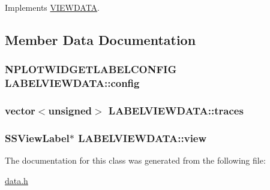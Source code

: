 Implements \hyperlink{class_v_i_e_w_d_a_t_a_1b4cca271e32b8d47b615e75dbf0624e}{VIEWDATA}.

\subsection{Member Data Documentation}
\hypertarget{class_l_a_b_e_l_v_i_e_w_d_a_t_a_932c69aa990d980c0240d2f200e5fda6}{
\subsubsection[{config}]{\setlength{\rightskip}{0pt plus 5cm}NPLOTWIDGETLABELCONFIG {\bf LABELVIEWDATA::config}}}
\label{class_l_a_b_e_l_v_i_e_w_d_a_t_a_932c69aa990d980c0240d2f200e5fda6}


\hypertarget{class_l_a_b_e_l_v_i_e_w_d_a_t_a_7bd9372bf57d18700d287c7fc3531295}{
\subsubsection[{traces}]{\setlength{\rightskip}{0pt plus 5cm}vector$<$unsigned$>$ {\bf LABELVIEWDATA::traces}}}
\label{class_l_a_b_e_l_v_i_e_w_d_a_t_a_7bd9372bf57d18700d287c7fc3531295}


\hypertarget{class_l_a_b_e_l_v_i_e_w_d_a_t_a_d315808823af5c15767c1100bc226074}{
\subsubsection[{view}]{\setlength{\rightskip}{0pt plus 5cm}SSViewLabel$\ast$ {\bf LABELVIEWDATA::view}}}
\label{class_l_a_b_e_l_v_i_e_w_d_a_t_a_d315808823af5c15767c1100bc226074}




The documentation for this class was generated from the following file:\begin{CompactItemize}
\item 
\hyperlink{data_8h}{data.h}\end{CompactItemize}
